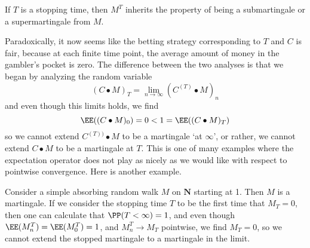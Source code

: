 \begin{theorem}
    If $T$ is a stopping time, then $M^T$ inherits the property of being a submartingale or a supermartingale from $M$.
\end{theorem}

Paradoxically, it now seems like the betting strategy corresponding to $T$ and $C$ is fair, because at each finite time point, the average amount of money in the gambler's pocket is zero. The difference between the two analyses is that we began by analyzing the random variable
%
\[ (C \bullet M)_T = \lim_{n \to \infty} (C^{(T)} \bullet M)_n \]
%
and even though this limits holds, we find
%
\[ \EE((C \bullet M)_0) = 0 < 1 = \EE((C \bullet M)_T) \]
%
so we cannot extend $C^{(T))} \bullet M$ to be a martingale `at $\infty$', or rather, we cannot extend $C \bullet M$ to be a martingale at $T$. This is one of many examples where the expectation operator does not play as nicely as we would like with respect to pointwise convergence. Here is another example.

\begin{example}
    Consider a simple absorbing random walk $M$ on $\mathbf{N}$ starting at 1. Then $M$ is a martingale. If we consider the stopping time $T$ to be the first time that $M_T = 0$, then one can calculate that $\PP(T < \infty) = 1$, and even though $\EE(M^T_n) = \EE(M^T_0) = 1$, and $M^T_n \to M_T$ pointwise, we find $M_T = 0$, so we cannot extend the stopped martingale to a martingale in the limit.
\end{example}

